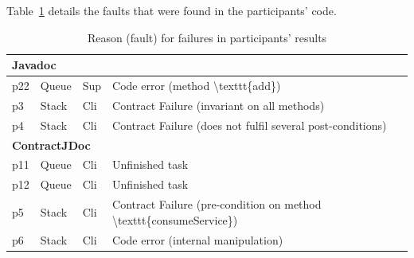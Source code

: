 Table~\ref{tab:faults} details the faults that were found in the participants' code.

\begin{table}
\centering
\caption{Reason (fault) for failures in participants' results}
\label{tab:faults}
\begin{adjustbox}{width=\textwidth}
\begin{tabular}{|l|l|l|l|} 
\hline
\multicolumn{4}{|l|}{\textbf{Javadoc} }                                                                                                                                                                         \\ 
\hline
p22                                        & Queue                             & Sup                                & Code error (method \textbackslash{}texttt\{add\})                                         \\ 
\hline
p3                                         & Stack                             & Cli                                & Contract Failure (invariant on all methods)                                               \\ 
\hline
p4                                         & Stack                             & Cli                                & Contract Failure (does not fulfil several post-conditions)                                \\ 
\hline
\multicolumn{4}{|l|}{\textbf{ContractJDoc }}                                                                                                                                                                    \\ 
\hline
p11                                        & Queue                             & Cli                                & Unfinished task                                                                           \\ 
\hline
p12                                        & Queue                             & Cli                                & Unfinished task                                                                           \\ 
\hline
p5                                         & Stack                             & Cli                                & Contract Failure (pre-condition on method \textbackslash{}texttt\{consumeService\})       \\ 
\hline
p6                                         & Stack                             & Cli                                & Code error (internal manipulation)                                                        \\ 

\end{tabular}
\end{adjustbox}
\end{table}
